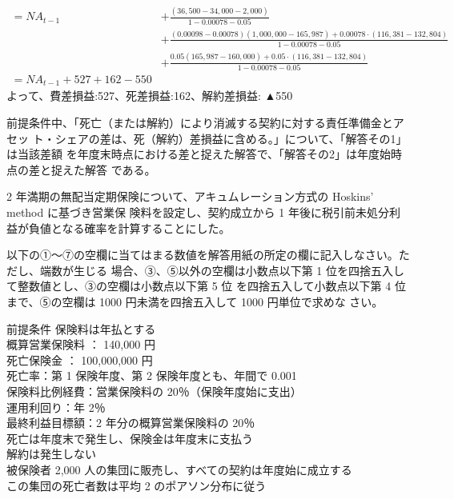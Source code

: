 \documentclass[report,gutter=10mm,fore-edge=10mm,uplatex,dvipdfmx]{jlreq}
\begin{document}
\begin{align*}
=NA_{t-1}&+\frac{(36,500-34,000-2,000)}{1-0.00078-0.05}\\
&+\frac{(0.00098-0.00078)(1,000,000-165,987)+0.00078\cdot(116,381-132,804)}{1-0.00078-0.05}\\
&+\frac{0.05(165,987-160,000)+0.05\cdot(116,381-132,804)}{1-0.00078-0.05}\\
= NA_{t-1}+527+162-550
\end{align*}
よって、費差損益:527、死差損益:162、解約差損益: ▲550

前提条件中、「死亡（または解約）により消滅する契約に対する責任準備金とアセッ
ト・シェアの差は、死（解約）差損益に含める。」について、「解答その1」は当該差額
を年度末時点における差と捉えた解答で、「解答その2」は年度始時点の差と捉えた解答
である。

2 年満期の無配当定期保険について、アキュムレーション方式の Hoskins’ method に基づき営業保
険料を設定し、契約成立から 1 年後に税引前未処分利益が負値となる確率を計算することにした。

以下の①～⑦の空欄に当てはまる数値を解答用紙の所定の欄に記入しなさい。ただし、端数が生じる
場合、③、⑤以外の空欄は小数点以下第 1 位を四捨五入して整数値とし、③の空欄は小数点以下第 5 位
を四捨五入して小数点以下第 4 位まで、⑤の空欄は 1000 円未満を四捨五入して 1000 円単位で求めな
さい。

\begin{itembox}[l]{前提条件}
保険料は年払とする\\
概算営業保険料 ： 140,000 円\\
死亡保険金 ： 100,000,000 円\\
死亡率：第 1 保険年度、第 2 保険年度とも、年間で 0.001\\
保険料比例経費：営業保険料の 20％（保険年度始に支出）\\
運用利回り：年 2％\\
最終利益目標額：2 年分の概算営業保険料の 20％\\
死亡は年度末で発生し、保険金は年度末に支払う\\
解約は発生しない\\
被保険者 2,000 人の集団に販売し、すべての契約は年度始に成立する\\
この集団の死亡者数は平均 2 のポアソン分布に従う\\
\end{itembox}
 
\end{document}

